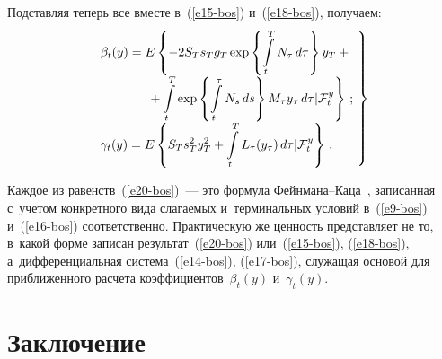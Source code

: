 \begin{multicols}{2}
     Подставляя теперь все вместе в~(\ref{e15-bos}) и~(\ref{e18-bos}), 
получаем:
     \begin{equation}
     \left.
     \begin{array}{l}
     \hspace*{-2.8mm}\displaystyle \beta_t(y)=E\left\{ -2S_T s_T g_T \exp \left\{ \int\limits_t^T 
N_\tau\,d\tau\right\} y_T +{}\right.\\
\displaystyle\hspace*{10mm}\left.{}+\int\limits_t^T \exp \left\{ \int\limits_t^\tau 
N_s\,ds\right\} M_\tau y_\tau \,d\tau\vert \mathcal{F}_t^y\right\}\,;\\[6pt]
      \hspace*{-2.8mm}    \displaystyle \gamma_t(y)=E\left\{ S_T s_T^2 y_T^2+\int\limits_t^T 
L_\tau(y_\tau)\,d\tau \vert \mathcal{F}_t^y\right\}\,.
     \end{array}\!
     \right\}\!\!
     \label{e20-bos}
     \end{equation}
     
     Каждое из равенств~(\ref{e20-bos})~--- это формула  
Фейн\-ма\-на--Ка\-ца~\cite{9-bos}, записанная с~учетом конкретного вида 
слагаемых и~терминальных условий в~(\ref{e9-bos}) и~(\ref{e16-bos}) 
соответственно. Практическую же ценность представляет не то, в~какой 
форме записан результат~(\ref{e20-bos}) или~(\ref{e15-bos}), (\ref{e18-bos}), 
а~дифференциальная система~(\ref{e14-bos}), (\ref{e17-bos}), служащая 
основой для приближенного расчета коэффициентов~$\beta_t(y)$ 
и~$\gamma_t(y)$. 

\section{Заключение}


\end{multicols}
